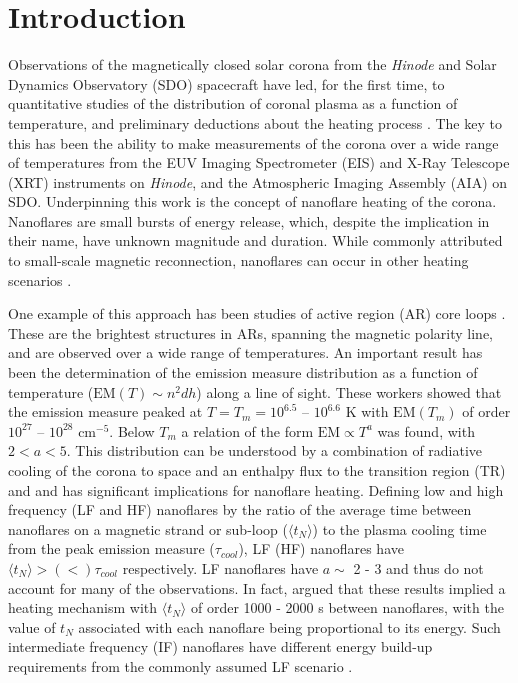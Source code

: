 \documentclass[iop]{emulateapj}
\begin{document}
	\section{Introduction}
	\label{sec:intro}
	\par Observations of the magnetically closed solar corona from the \textit{Hinode} \citep{kosugi_hinode_2007} and Solar Dynamics Observatory (SDO) \citep{pesnell_solar_2012} spacecraft have led, for the first time, to quantitative studies of the distribution of coronal plasma as a function of temperature, and preliminary deductions about the heating process \citep[see papers in][]{de_moortel_recent_2015}. The key to this has been the ability to make measurements of the corona over a wide range of temperatures from the EUV Imaging Spectrometer (EIS) \citep{culhane_euv_2007} and X-Ray Telescope (XRT) \citep{golub_x-ray_2007} instruments on \textit{Hinode}, and the Atmospheric Imaging Assembly (AIA) \citep{lemen_atmospheric_2012} on SDO. Underpinning this work is the concept of nanoflare heating of the corona. Nanoflares \citep[e.g.][]{parker_nanoflares_1988} are small bursts of energy release, which, despite the implication in their name, have unknown magnitude and duration. While commonly attributed to small-scale magnetic reconnection, nanoflares can occur in other heating scenarios \citep[e.g.][]{ofman_self-consistent_1998}.
%
	\par One example of this approach has been studies of active region (AR) core loops \citep{warren_constraints_2011,warren_systematic_2012,winebarger_using_2011,tripathi_emission_2011,schmelz_cold_2012,bradshaw_diagnosing_2012,reep_diagnosing_2013,del_zanna_evolution_2015}. These are the brightest structures in ARs, spanning the magnetic polarity line, and are observed over a wide range of temperatures. An important result has been the determination of the emission measure distribution as a function of temperature ($\mathrm{EM}(T)\sim n^2dh$) along a line of sight. These workers showed that the emission measure peaked at $T = T_m = 10^{6.5}$ – $10^{6.6}$ K with $\mathrm{EM}(T_m)$ of order $10^{27}$ – $10^{28}$ cm$^{-5}$.  Below $T_m$ a relation of the form $\mathrm{EM} \propto T^a$ was found, with $2 < a < 5$. This distribution can be understood by a combination of radiative cooling of the corona to space and an enthalpy flux to the transition region (TR) \citep[e.g.][]{bradshaw_cooling_2010,bradshaw_new_2010} and and has significant implications for nanoflare heating. Defining low and high frequency (LF and HF) nanoflares by the ratio of the average time between nanoflares on a magnetic strand or sub-loop ($\langle t_N \rangle$) to the plasma cooling time from the peak emission measure ($\tau_{cool}$), LF (HF) nanoflares have $\langle t_N \rangle > (<) \tau_{cool}$ respectively. LF nanoflares have $a \sim$ 2 - 3 and thus do not account for many of the observations. In fact, \citet{cargill_active_2014} argued that these results implied a heating mechanism with $\langle t_N \rangle$ of order 1000 - 2000 s between nanoflares, with the value of $t_N$ associated with each nanoflare being proportional to its energy. Such intermediate frequency (IF) nanoflares have different energy build-up requirements from the commonly assumed LF scenario \citep{cargill_active_2014}.  
\end{document}
